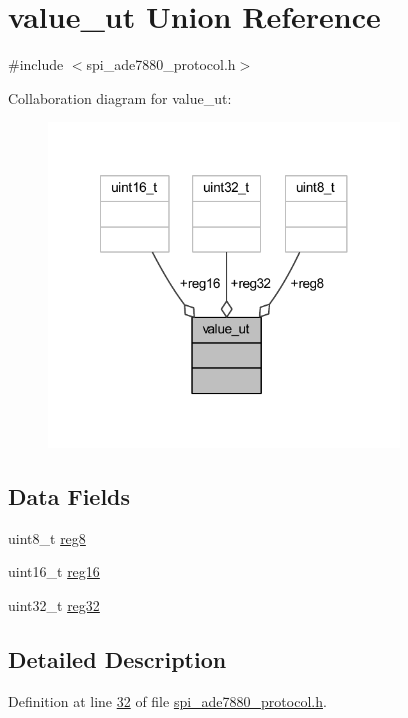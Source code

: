 \hypertarget{a00034}{\section{value\-\_\-ut Union Reference}
\label{db/df3/a00034}
}


{\ttfamily \#include $<$spi\-\_\-ade7880\-\_\-protocol.\-h$>$}



Collaboration diagram for value\-\_\-ut\-:\nopagebreak
\begin{figure}[H]
\begin{center}
\leavevmode
\includegraphics[width=264pt]{d4/d3a/a00101}
\end{center}
\end{figure}
\subsection*{Data Fields}
\begin{DoxyCompactItemize}
\item 
uint8\-\_\-t \hyperlink{a00034_a90b3f782e917edca7101e7803a3773b7}{reg8}
\item 
uint16\-\_\-t \hyperlink{a00034_a0c22d234d52e616d449a8c264bf2030b}{reg16}
\item 
uint32\-\_\-t \hyperlink{a00034_a83e2be8d3feb1bcbc286bfaae10ac552}{reg32}
\end{DoxyCompactItemize}


\subsection{Detailed Description}


Definition at line \hyperlink{a00041_source_l00032}{32} of file \hyperlink{a00041_source}{spi\-\_\-ade7880\-\_\-protocol.\-h}.



